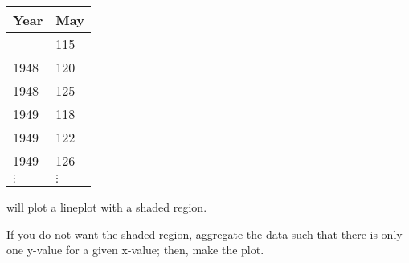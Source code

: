 \documentclass[
  letterpaper,
  DIV=11,
  numbers=noendperiod]{scrreprt}
\begin{document}
\begin{longtable}[]{@{}ll@{}}
\toprule\noalign{}
Year & May \\
\midrule\noalign{}
\endhead
\bottomrule\noalign{}
\endlastfoot
1948 & 115 \\
1948 & 120 \\
1948 & 125 \\
1949 & 118 \\
1949 & 122 \\
1949 & 126 \\
\(\vdots\) & \(\vdots\) \\
\end{longtable}

will plot a lineplot with a shaded region.

If you do not want the shaded region, aggregate the data such that there
is only one y-value for a given x-value; then, make the plot.
\end{document}
